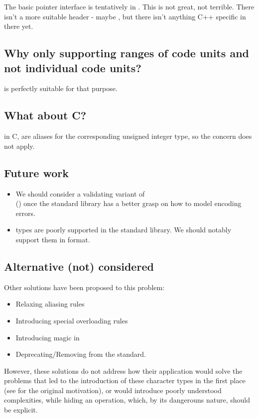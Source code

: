 \documentclass{wg21}
\begin{document}
The basic pointer interface is tentatively in . This is not great, not terrible.
There isn't a more suitable header - maybe , but there isn't anything C++ specific in there yet.

\subsection{Why only supporting ranges of code units and not individual code units?}

 is perfectly suitable for that purpose.

\subsection{What about C?}

in C,  are aliases for the corresponding unsigned integer type, so the concern does not apply.


\subsection{Future work}
\begin{itemize}
\item We should consider a validating variant of \\() once the standard library has a better
grasp on how to model encoding errors.
\item {} types are poorly supported in the standard library. We should notably support them in format.
\end{itemize}

\subsection{Alternative (not) considered}
Other solutions have been proposed to this problem:
\begin{itemize}
    \item Relaxing aliasing rules
    \item Introducing special overloading rules
    \item Introducing magic in 
    \item Deprecating/Removing  from the standard.
\end{itemize}

However, these solutions do not address how their application would solve the problems that led to the introduction of these character types
in the first place (see  for the original motivation), or would introduce poorly understood complexities, while hiding an operation,
which, by its dangerouns nature, should be explicit.
\end{document}
